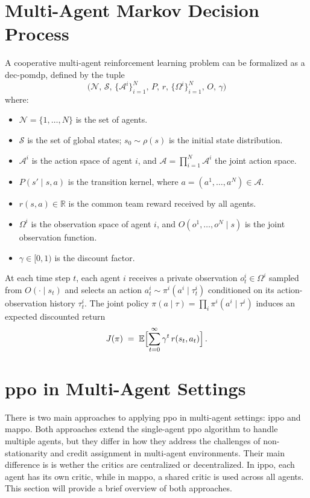 \section{Multi-Agent Markov Decision Process}
A cooperative multi-agent reinforcement learning problem can be formalized as a \gls{dec-pomdp}\cite{oliehoek_concise_2016}, defined by the tuple
\[
  \bigl(\mathcal{N},\,\mathcal{S},\,\{\mathcal{A}^i\}_{i=1}^N,\,P,\,r,\,\{\Omega^i\}_{i=1}^N,\,O,\,\gamma\bigr)
\]
where:
\begin{itemize}
  \item $\mathcal{N} = \{1,\dots,N\}$ is the set of agents.
  \item $\mathcal{S}$ is the set of global states; $s_0\sim\rho(s)$ is the initial state distribution.
  \item $\mathcal{A}^i$ is the action space of agent $i$, and $\mathcal{A} = \prod_{i=1}^N\mathcal{A}^i$ the joint action space.
  \item $P(s' \mid s, a)$ is the transition kernel, where $a=(a^1,\dots,a^N)\in\mathcal{A}$.
  \item $r(s,a)\in\mathbb{R}$ is the common team reward received by all agents.
  \item $\Omega^i$ is the observation space of agent $i$, and $O(o^1,\dots,o^N\mid s)$ is the joint observation function.
  \item $\gamma\in[0,1)$ is the discount factor.
\end{itemize}
At each time step $t$, each agent $i$ receives a private observation $o^i_t\in\Omega^i$ sampled from $O(\cdot\mid s_t)$ and selects an action $a^i_t\sim\pi^i(a^i\mid\tau^i_t)$ conditioned on its action-observation history $\tau^i_t$. The joint policy $\pi(a\mid \tau) = \prod_i \pi^i(a^i\mid \tau^i)$ induces an expected discounted return
\[
  J(\pi) \;=\; \mathbb{E}\Bigl[\sum_{t=0}^\infty \gamma^t\,r(s_t, a_t)\Bigr]\,. 
\]

\section{\gls{ppo} in Multi-Agent Settings}
There is two main approaches to applying \gls{ppo} in multi-agent settings: \gls{ippo} and \gls{mappo}. Both approaches extend the single-agent \gls{ppo} algorithm to handle multiple agents, but they differ in how they address the challenges of non-stationarity and credit assignment in multi-agent environments. Their main difference is is wether the critics are centralized or decentralized. In \gls{ippo}, each agent has its own critic, while in \gls{mappo}, a shared critic is used across all agents. This section will provide a brief overview of both approaches.

